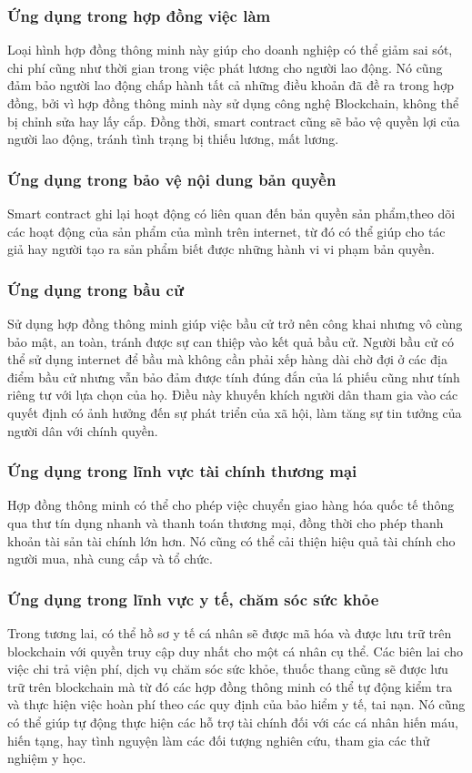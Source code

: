 \documentclass[a4paper]{article}
\begin{document}
\subsubsection{Ứng dụng trong hợp đồng việc làm}
Loại hình hợp đồng thông minh này giúp cho doanh nghiệp có thể giảm sai sót, chi phí cũng như thời gian trong việc phát lương cho người lao động. Nó cũng đảm bảo người lao động chấp hành tất cả những điều khoản đã đề ra trong hợp đồng, bởi vì hợp đồng thông minh này sử dụng công nghệ Blockchain, không thể bị chỉnh sửa hay lấy cắp. Đồng thời, smart contract cũng sẽ bảo vệ quyền lợi của người lao động, tránh tình trạng bị thiếu lương, mất lương.

\subsubsection{Ứng dụng trong bảo vệ nội dung bản quyền}
Smart contract ghi lại hoạt động có liên quan đến bản quyền sản phẩm,theo dõi các hoạt động của sản phẩm của mình trên internet, từ đó có thể giúp cho tác giả hay người tạo ra sản phẩm biết được những hành vi vi phạm bản quyền.

\subsubsection{Ứng dụng trong bầu cử}
Sử dụng hợp đồng thông minh giúp việc bầu cử trở nên công khai nhưng vô cùng bảo mật, an toàn, tránh được sự can thiệp vào kết quả bầu cử. Người bầu cử có thể sử dụng internet để bầu mà không cần phải xếp hàng dài chờ đợi ở các địa điểm bầu cử nhưng vẫn bảo đảm được tính đúng đắn của lá phiếu cũng như tính riêng tư với lựa chọn của họ. Điều này khuyến khích người dân tham gia vào các quyết định có ảnh hưởng đến sự phát triển của xã hội, làm tăng sự tin tưởng của người dân với chính quyền.

\subsubsection{Ứng dụng trong lĩnh vực tài chính thương mại}
Hợp đồng thông minh có thể cho phép việc chuyển giao hàng hóa quốc tế thông qua thư tín dụng nhanh và thanh toán thương mại, đồng thời cho phép thanh khoản tài sản tài chính lớn hơn. Nó cũng có thể cải thiện hiệu quả tài chính cho người mua, nhà cung cấp và tổ chức.

\subsubsection{Ứng dụng trong lĩnh vực y tế, chăm sóc sức khỏe}
Trong tương lai, có thể hồ sơ y tế cá nhân sẽ được mã hóa và được lưu trữ trên blockchain với quyền truy cập duy nhất cho một cá nhân cụ thể. Các biên lai cho việc chi trả viện phí, dịch vụ chăm sóc sức khỏe, thuốc thang cũng sẽ được lưu trữ trên blockchain mà từ đó các hợp đồng thông minh có thể tự động kiểm tra và thực hiện việc hoàn phí theo các quy định của bảo hiểm y tế, tai nạn. Nó cũng có thể giúp tự động thực hiện các hỗ trợ tài chính đối với các cá nhân hiến máu, hiến tạng, hay tình nguyện làm các đối tượng nghiên cứu, tham gia các thử nghiệm y học.
\end{document}
